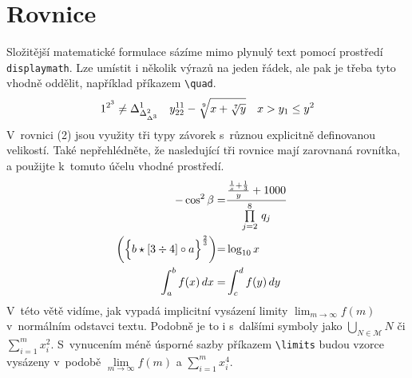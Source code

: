 \documentclass[11pt, twocolumn, a4paper]{article}
\theoremstyle{definition}
\begin{document}
\section{Rovnice}
Složitější matematické formulace sázíme mimo plynulý text pomocí prostředí \verb|displaymath|.
Lze umístit i několik výrazů na jeden řádek, ale pak je třeba tyto vhodně oddělit, například
příkazem \verb|\quad|.
\begin{displaymath}
    1^{2^{3}} \neq \Delta^{1}_{\Delta^{2}_{\Delta^{3}}} \quad
    y^{11}_{22} - \sqrt[\leftroot{-1}\uproot{1}9]{x + \sqrt[\leftroot{-1}\uproot{1}7]{y}} \quad
    x > y_1 \leq y^2
\end{displaymath}
V~rovnici (2) jsou využity tři typy závorek s~různou explicitně definovanou velikostí.
Také nepřehlédněte, že nasledující tři rovnice mají zarovnaná rovnítka, a použijte
k~tomuto účelu vhodné prostředí.
\begin{align}
        - \cos^2 \beta = & \frac{\frac{\frac{1}{x} + \frac{1}{3}}{y} + 1000}
         {\overset{8}{\underset{j=2}{\prod}}~q_j} &\\
        \biggl( \Bigl\{ b \star [3 \div 4] \circ a \Bigl\}^{\frac{2}{3}} \biggl) = & \log_{10}x & \\
        \int_{a}^{b} f(x)\,dx = & \int_{c}^{d} f(y)\,dy 
\end{align}
V~této větě vidíme, jak vypadá implicitní vysázení limity ${\lim_{m\to\infty}f(m)}$ 
v~normálním odstavci textu. Podobně je to i s~dalšími symboly jako ${\bigcup_{N \in \mathcal{M}}N}$ či
${\sum_{i=1}^{m} x^{2}_{i}}$. S~vynucením méně úsporné sazby příkazem \verb|\limits| budou vzorce 
vysázeny v~podobě ${{\lim\limits_{m\to\infty}}} f(m)$ a ${\sum\limits_{i=1}^{m}x^{4}_{i}}$.
\end{document}
